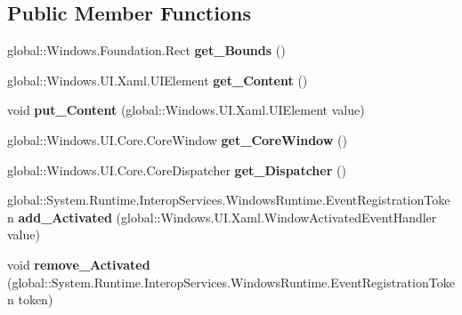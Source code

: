 \subsection*{Public Member Functions}
\begin{DoxyCompactItemize}
\item 
\mbox{\label{class_windows_1_1_u_i_1_1_xaml_1_1_window_a3b4023c9ffd4210037266cde25034d90}} 
global\+::\+Windows.\+Foundation.\+Rect {\bfseries get\+\_\+\+Bounds} ()
\item 
\mbox{\label{class_windows_1_1_u_i_1_1_xaml_1_1_window_ae8eec75ce505d25ba6c2553adc1784b5}} 
global\+::\+Windows.\+U\+I.\+Xaml.\+U\+I\+Element {\bfseries get\+\_\+\+Content} ()
\item 
\mbox{\label{class_windows_1_1_u_i_1_1_xaml_1_1_window_ad4e7eb6e2bbbcc9db175cc0467fa6060}} 
void {\bfseries put\+\_\+\+Content} (global\+::\+Windows.\+U\+I.\+Xaml.\+U\+I\+Element value)
\item 
\mbox{\label{class_windows_1_1_u_i_1_1_xaml_1_1_window_a4ea24c3c21a169c23a2ae6ca99188f43}} 
global\+::\+Windows.\+U\+I.\+Core.\+Core\+Window {\bfseries get\+\_\+\+Core\+Window} ()
\item 
\mbox{\label{class_windows_1_1_u_i_1_1_xaml_1_1_window_a209f50e7cf5593a7150291903f99e541}} 
global\+::\+Windows.\+U\+I.\+Core.\+Core\+Dispatcher {\bfseries get\+\_\+\+Dispatcher} ()
\item 
\mbox{\label{class_windows_1_1_u_i_1_1_xaml_1_1_window_a9c86b88ed3cf1a52a88a638b75e01fa7}} 
global\+::\+System.\+Runtime.\+Interop\+Services.\+Windows\+Runtime.\+Event\+Registration\+Token {\bfseries add\+\_\+\+Activated} (global\+::\+Windows.\+U\+I.\+Xaml.\+Window\+Activated\+Event\+Handler value)
\item 
\mbox{\label{class_windows_1_1_u_i_1_1_xaml_1_1_window_a3d1b79b4484e987c7e8e39d71b41c7f6}} 
void {\bfseries remove\+\_\+\+Activated} (global\+::\+System.\+Runtime.\+Interop\+Services.\+Windows\+Runtime.\+Event\+Registration\+Token token)

\end{DoxyCompactItemize}
